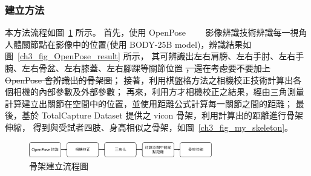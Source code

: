 \subsubsection{建立方法}
本方法流程如圖~\ref{ch3_fig_skeleton_flow} 所示。
首先，使用 OpenPose~\cite{8765346}~\cite{wei2016cpm}~\cite{simon2017hand}~\cite{cao2017realtime}
影像辨識技術辨識每一視角人體關節點在影像中的位置(使用 BODY-25B model)，辨識結果如圖~\ref{ch3_fig_OpenPose_result} 所示，
其可辨識出左右肩膀、左右手肘、左右手腕、左右骨盆、左右膝蓋、左右腳踝等關節位置 \sout{，還在考慮要不要加上 OpenPose 會辨識出的骨架圖}；
接著，利用棋盤格方法之相機校正技術計算出各個相機的內部參數及外部參數；
再來，利用方才相機校正之結果，經由三角測量計算建立出關節在空間中的位置，並使用距離公式計算每一關節之間的距離；
最後，基於 TotalCapture Dataset 提供之 vicon 骨架，利用計算出的距離進行骨架伸縮，
得到與受試者四肢、身高相似之骨架，如圖~\ref{ch3_fig_my_skeleton}。

\begin{figure}[!ht]
   \centering
   \includegraphics[width=8cm]{figure/ch3_fig_skeleton_flow.png}
    \caption[骨架建立流程圖]{骨架建立流程圖}
    \label{ch3_fig_skeleton_flow}
\end{figure}


